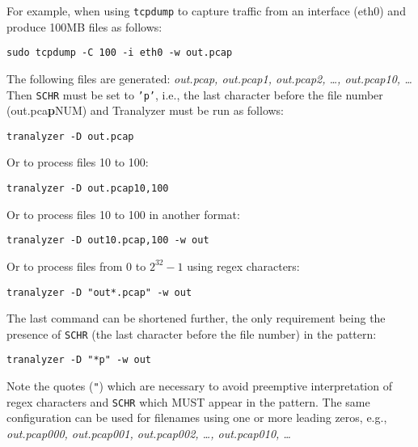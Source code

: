 For example, when using {\tt tcpdump} to capture traffic from an interface (eth0) and produce 100MB files as follows:
\begin{center}
    {\tt sudo tcpdump -C 100 -i eth0 -w out.pcap}
\end{center}
The following files are generated: {\em out.pcap, out.pcap1, out.pcap2, \ldots, out.pcap10, \ldots}\\

Then {\tt SCHR} must be set to {\tt 'p'}, i.e., the last character before the file number (out.pca{\bf p}NUM) and Tranalyzer must be run as follows:
\begin{center}
    {\tt tranalyzer -D out.pcap}
\end{center}

Or to process files 10 to 100:
\begin{center}
    {\tt tranalyzer -D out.pcap10,100}
\end{center}

Or to process files 10 to 100 in another format:
\begin{center}
    {\tt tranalyzer -D out10.pcap,100 -w out}
\end{center}

Or to process files from 0 to $2^{32}-1$ using regex characters:
\begin{center}
    {\tt tranalyzer -D "out*.pcap" -w out}
\end{center}

The last command can be shortened further, the only requirement being the presence of {\tt SCHR} (the last character before the file number) in the pattern:
\begin{center}
    {\tt tranalyzer -D "*p" -w out}
\end{center}
Note the quotes ({\tt "}) which are necessary to avoid preemptive interpretation of regex characters and {\tt SCHR} which MUST appear in the pattern. The same configuration can be used for filenames using one or more leading zeros, e.g., {\em out.pcap000, out.pcap001, out.pcap002, \ldots, out.pcap010, \ldots}\\

